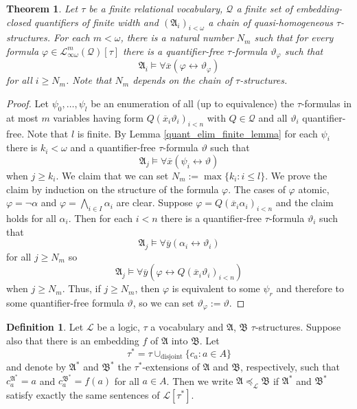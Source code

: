 \documentclass{ndjflart}
\theoremstyle{plain}
\newtheorem{theorem}[conjecture]{Theorem}
\theoremstyle{definition}
\newtheorem{definition}[conjecture]{Definition}
\numberwithin{equation}{section}
\DeclareMathOperator{\disjoint}{disjoint}
\begin{document}
\begin{theorem}\label{finite}
Let $\tau$ be a finite relational vocabulary, $\mathcal{Q}$ a finite set of embed\-ding-closed quantifiers of finite width and
$(\mathfrak{A}_i)_{i<\omega}$ a chain of quasi-ho\-mo\-ge\-neous $\tau$-structures.
For each $m< \omega$, there is a natural number $N_m$ such that for every formula $\varphi \in \mathcal{L}^m_{\infty \omega}(\mathcal{Q})[\tau]$ there is a quantifier-free $\tau$-formula $\vartheta_{\varphi}$ such that
\[
	\mathfrak{A}_i \vDash \forall \overline{x}(\varphi \leftrightarrow \vartheta_{\varphi})
\]
for all $i \geq N_m$.
Note that $N_m$ depends on the chain of $\tau$-structures.
\end{theorem}
\begin{proof}
Let $\psi_0,\dots,\psi_l$ be an enumeration of all (up to equivalence) the $\tau$-formulas in at most $m$ variables having form $Q(\overline{x}_i\vartheta_i)_{i<n}$ with $Q \in \mathcal{Q}$ and all $\vartheta_i$ quantifier-free.
Note that $l$ is finite.
By Lemma \ref{quant_elim_finite_lemma} for each $\psi_i$ there is $k_i < \omega$ and a quantifier-free $\tau$-formula $\vartheta$ such that
\[
	\mathfrak{A}_j \vDash \forall \overline{x} (\psi_i \leftrightarrow \vartheta)
\]
when $j \geq k_i$.
We claim that we can set $N_m := \max\{k_i : i \leq l\}$.
We prove the claim by induction on the structure of the formula $\varphi$.
The cases of $\varphi$ atomic, $\varphi = \neg \alpha$ and $\varphi = \bigwedge_{i \in I}\alpha_i$ are clear. Suppose $\varphi = Q(\overline{x}_i\alpha_i)_{i<n}$ and the claim holds for all $\alpha_i$.
Then for each $i < n$ there is a quantifier-free $\tau$-formula $\vartheta_i$ such that
\[
	\mathfrak{A}_j \vDash \forall \overline{y}(\alpha_i \leftrightarrow \vartheta_i)
\]
for all $j \geq N_m$ so
\[
	\mathfrak{A}_j \vDash \forall \overline{y}(\varphi \leftrightarrow Q(\overline{x}_i\vartheta_i)_{i<n})
\]
when $j \geq N_m$. Thus, if $j \geq N_m$, then $\varphi$ is equivalent to some $\psi_r$ and therefore to some quantifier-free formula $\vartheta$, so we can set $\vartheta_{\varphi} := \vartheta$.
\end{proof}

\begin{definition}
Let $\mathcal{L}$ be a logic, $\tau$ a vocabulary and $\mathfrak{A}$, $\mathfrak{B}$ $\tau$-structures.
Suppose also that there is an embedding $f$ of $\mathfrak{A}$ into $\mathfrak{B}$.
Let
\[
	\tau^* = \tau \cup_{\disjoint} \{c_a : a \in A\}
\]
and denote by $\mathfrak{A}^*$ and $\mathfrak{B}^*$ the $\tau^*$-extensions of $\mathfrak{A}$ and $\mathfrak{B}$, respectively, such that $c_a^{\mathfrak{A}^*} = a$ and $c_a^{\mathfrak{B}^*} = f(a)$ for all $a \in A$.
Then we write $\mathfrak{A} \preceq_{\mathcal{L}} \mathfrak{B}$ if $\mathfrak{A}^*$ and $\mathfrak{B}^*$ satisfy exactly the same sentences of $\mathcal{L}[\tau^*]$.
\end{definition}
\end{document}
